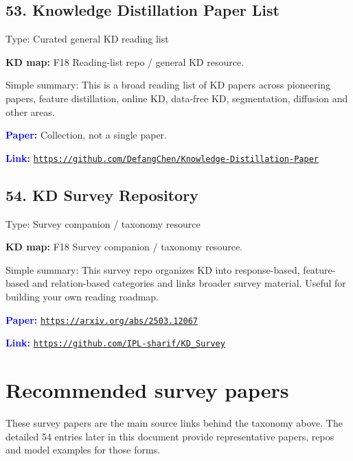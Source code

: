 \documentclass[10pt]{article}
\begin{document}
\subsection*{53. Knowledge Distillation Paper List}
Type: Curated general KD reading list\par
\textbf{KD map:} F18 Reading-list repo / general KD resource.\par
Simple summary: This is a broad reading list of KD papers across pioneering papers, feature distillation, online KD, data-free KD, segmentation, diffusion and other areas.\par
\textcolor{blue}{\textbf{Paper:}} Collection, not a single paper.\par
\textcolor{blue}{\textbf{Link:}} \href{https://github.com/DefangChen/Knowledge-Distillation-Paper}{\nolinkurl{https://github.com/DefangChen/Knowledge-Distillation-Paper}}\par

\subsection*{54. KD Survey Repository}
Type: Survey companion / taxonomy resource\par
\textbf{KD map:} F18 Survey companion / taxonomy resource.\par
Simple summary: This survey repo organizes KD into response-based, feature-based and relation-based categories and links broader survey material. Useful for building your own reading roadmap.\par
\textcolor{blue}{\textbf{Paper:}} \href{https://arxiv.org/abs/2503.12067}{\nolinkurl{https://arxiv.org/abs/2503.12067}}\par
\textcolor{blue}{\textbf{Link:}} \href{https://github.com/IPL-sharif/KD_Survey}{\nolinkurl{https://github.com/IPL-sharif/KD_Survey}}\par



\section*{Recommended survey papers}

These survey papers are the main source links behind the taxonomy above. The detailed 54 entries later in this document provide representative papers, repos and model examples for those forms.\par
\end{document}
